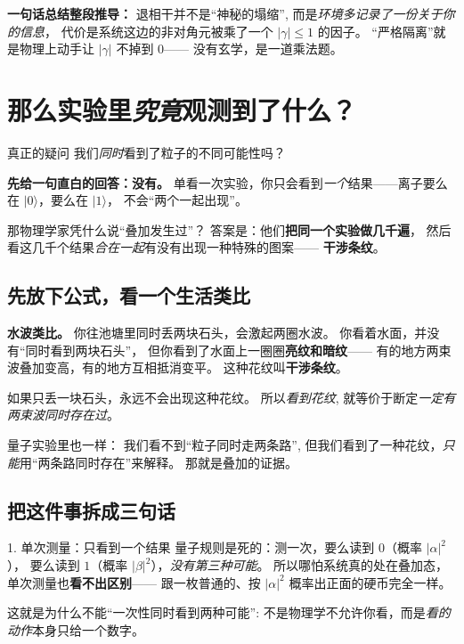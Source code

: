 \documentclass[11pt,a4paper]{ctexart}
\begin{document}
\begin{keypointblock}
\textbf{一句话总结整段推导：}
退相干并不是``神秘的塌缩'',
而是\emph{环境多记录了一份关于你的信息}，
代价是系统这边的非对角元被乘了一个 $|\gamma| \le 1$ 的因子。
``严格隔离''就是物理上动手让 $|\gamma|$ 不掉到 $0$——
没有玄学，是一道乘法题。
\end{keypointblock}

\section{那么实验里\emph{究竟}观测到了什么？}

\begin{questionblock}{真正的疑问}
我们\emph{同时}看到了粒子的不同可能性吗？
\end{questionblock}

\begin{answerblock}
\textbf{先给一句直白的回答：没有。}
单看一次实验，你只会看到\emph{一个}结果——离子要么在 $\lvert 0\rangle$，要么在 $\lvert 1\rangle$，
不会``两个一起出现''。

那物理学家凭什么说``叠加发生过''？
答案是：他们\textbf{把同一个实验做几千遍}，
然后看这几千个结果\emph{合在一起}有没有出现一种特殊的图案——
\textbf{干涉条纹}。
\end{answerblock}

\subsection{先放下公式，看一个生活类比}

\begin{lifeblock}
\textbf{水波类比。}
你往池塘里同时丢两块石头，会激起两圈水波。
你看着水面，并没有``同时看到两块石头''，
但你看到了水面上一圈圈\textbf{亮纹和暗纹}——
有的地方两束波叠加变高，有的地方互相抵消变平。
这种花纹叫\textbf{干涉条纹}。
\smallskip

如果只丢一块石头，永远不会出现这种花纹。
所以\emph{看到花纹}, 就等价于断定\emph{一定有两束波同时存在过}。
\smallskip

量子实验里也一样：
我们看不到``粒子同时走两条路'',
但我们看到了一种花纹，\emph{只能}用``两条路同时存在''来解释。
那就是叠加的证据。
\end{lifeblock}

\subsection{把这件事拆成三句话}

\begin{stepblock}{1. 单次测量：只看到一个结果}
量子规则是死的：测一次，要么读到 $0$（概率 $|\alpha|^2$），
要么读到 $1$（概率 $|\beta|^2$），\emph{没有第三种可能}。
所以哪怕系统真的处在叠加态，单次测量也\textbf{看不出区别}——
跟一枚普通的、按 $|\alpha|^2$ 概率出正面的硬币完全一样。
\smallskip

这就是为什么不能``一次性同时看到两种可能'':
不是物理学不允许你看，而是\emph{看的动作}本身只给一个数字。
\end{stepblock}
\end{document}

